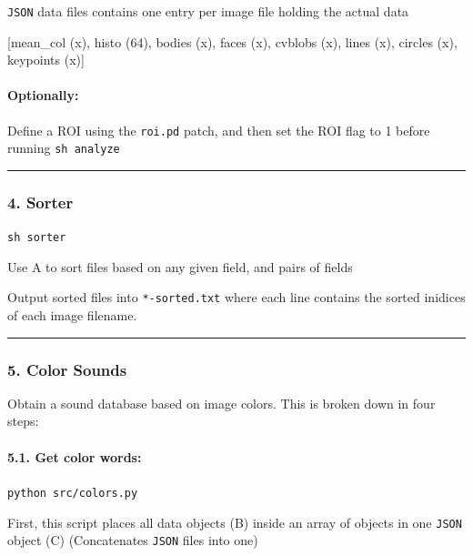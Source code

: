 \texttt{JSON} data files contains one entry per image file holding the actual data

{[}mean\_col (x), histo (64), bodies (x), faces (x), cvblobs (x), lines (x), circles (x), keypoints (x){]}

\hypertarget{optionally}{%
\paragraph{Optionally:}\label{optionally}}

Define a ROI using the \texttt{roi.pd} patch, and then set the ROI flag to 1 before running \texttt{sh\ analyze}

\begin{center}\rule{0.5\linewidth}{\linethickness}\end{center}

\hypertarget{sorter}{%
\subsubsection{4. Sorter}\label{sorter}}

\texttt{sh\ sorter}

Use A to sort files based on any given field, and pairs of fields

Output sorted files into \texttt{*-sorted.txt} where each line contains the sorted inidices of each image filename.

\begin{center}\rule{0.5\linewidth}{\linethickness}\end{center}

\hypertarget{color-sounds}{%
\subsubsection{5. Color Sounds}\label{color-sounds}}

Obtain a sound database based on image colors. This is broken down in four steps:

\hypertarget{get-color-words}{%
\paragraph{5.1. Get color words:}\label{get-color-words}}

\texttt{python\ src/colors.py}

First, this script places all data objects (B) inside an array of objects in one \texttt{JSON} object (C) (Concatenates \texttt{JSON} files into one)

